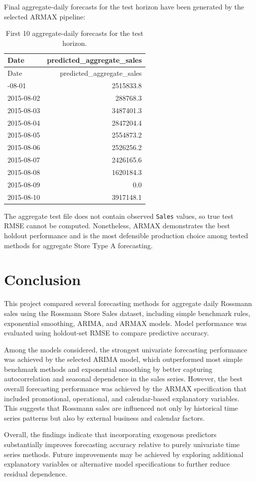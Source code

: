 \documentclass[
  12pt,
]{article}
\begin{document}
Final aggregate-daily forecasts for the test horizon have been generated
by the selected ARMAX pipeline:

\begin{longtable}[]{@{}lr@{}}
\caption{First 10 aggregate-daily forecasts for the test
horizon.}\tabularnewline
\toprule\noalign{}
Date & predicted\_aggregate\_sales \\
\midrule\noalign{}
\endfirsthead
\toprule\noalign{}
Date & predicted\_aggregate\_sales \\
\midrule\noalign{}
\endhead
\bottomrule\noalign{}
\endlastfoot
2015-08-01 & 2515833.8 \\
2015-08-02 & 288768.3 \\
2015-08-03 & 3487401.3 \\
2015-08-04 & 2847204.4 \\
2015-08-05 & 2554873.2 \\
2015-08-06 & 2526256.2 \\
2015-08-07 & 2426165.6 \\
2015-08-08 & 1620184.3 \\
2015-08-09 & 0.0 \\
2015-08-10 & 3917148.1 \\
\end{longtable}

The aggregate test file does not contain observed \texttt{Sales} values,
so true test RMSE cannot be computed. Nonetheless, ARMAX demonstrates
the best holdout performance and is the most defensible production
choice among tested methods for aggregate Store Type A forecasting.

\section{Conclusion}\label{conclusion}

This project compared several forecasting methods for aggregate daily
Rossmann sales using the Rossmann Store Sales dataset, including simple
benchmark rules, exponential smoothing, ARIMA, and ARMAX models. Model
performance was evaluated using holdout-set RMSE to compare predictive
accuracy.

Among the models considered, the strongest univariate forecasting
performance was achieved by the selected ARIMA model, which outperformed
most simple benchmark methods and exponential smoothing by better
capturing autocorrelation and seasonal dependence in the sales series.
However, the best overall forecasting performance was achieved by the
ARMAX specification that included promotional, operational, and
calendar-based explanatory variables. This suggests that Rossmann sales
are influenced not only by historical time series patterns but also by
external business and calendar factors.

Overall, the findings indicate that incorporating exogenous predictors
substantially improves forecasting accuracy relative to purely
univariate time series methods. Future improvements may be achieved by
exploring additional explanatory variables or alternative model
specifications to further reduce residual dependence.
\end{document}
